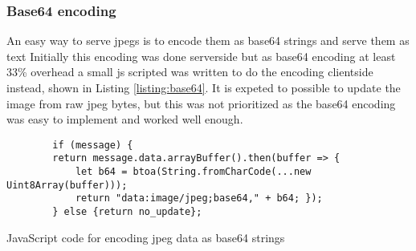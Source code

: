 \subsubsection{Base64 encoding}
An easy way to serve \glspl{jpeg} is to encode them as base64 strings and serve them as text \cite{rAnswerHowDisplay2013}
Initially this encoding was done serverside but as base64 encoding at least 33\% overhead a small \gls{js} scripted was written to do the encoding clientside instead, shown in Listing \ref{listing:base64}.
It is expeted to possible to update the image from raw \gls{jpeg} bytes, but this was not prioritized as the base64 encoding was easy to implement and worked well enough.

\begin{listing}[H]
    \begin{verbatim}
        if (message) {
        return message.data.arrayBuffer().then(buffer => {
            let b64 = btoa(String.fromCharCode(...new Uint8Array(buffer)));
            return "data:image/jpeg;base64," + b64; });
        } else {return no_update};
    \end{verbatim}
    \caption{JavaScript code for encoding \gls{jpeg} data as base64 strings}
    \label{listing:base64}
\end{listing}






